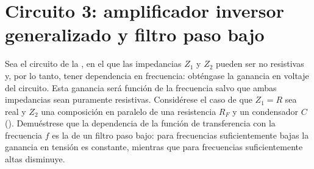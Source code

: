 \section{Circuito 3: amplificador inversor generalizado y filtro paso bajo}\label{sec:filtro}
\begin{prelab}
Sea el circuito de la , en el que las impedancias $Z_1$ y $Z_2$ pueden ser no
resistivas y, por lo tanto, tener dependencia en frecuencia: obténgase la ganancia en voltaje del circuito.
Esta ganancia será función de la frecuencia salvo que ambas impedancias sean puramente resistivas.
Considérese el caso de que $Z_1=R$ sea real y $Z_2$ una composición en paralelo de una resistencia $R_F$ y
un condensador $C$ (). Demuéstrese que la dependencia de la función de
transferencia con la frecuencia $f$ es la de un filtro paso bajo: para frecuencias suficientemente bajas
la ganancia en tensión es constante, mientras que para frecuencias suficientemente altas disminuye.
\end{prelab}



